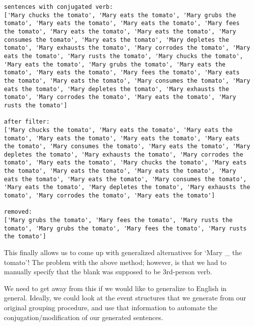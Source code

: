 \documentclass[11pt]{article}
\begin{document}
    \begin{Verbatim}[commandchars=\\\{\}]
sentences with conjugated verb: 
['Mary chucks the tomato', 'Mary eats the tomato', 'Mary grubs the tomato', 'Mary eats the tomato', 'Mary eats the tomato', 'Mary fees the tomato', 'Mary eats the tomato', 'Mary eats the tomato', 'Mary consumes the tomato', 'Mary eats the tomato', 'Mary depletes the tomato', 'Mary exhausts the tomato', 'Mary corrodes the tomato', 'Mary eats the tomato', 'Mary rusts the tomato', 'Mary chucks the tomato', 'Mary eats the tomato', 'Mary grubs the tomato', 'Mary eats the tomato', 'Mary eats the tomato', 'Mary fees the tomato', 'Mary eats the tomato', 'Mary eats the tomato', 'Mary consumes the tomato', 'Mary eats the tomato', 'Mary depletes the tomato', 'Mary exhausts the tomato', 'Mary corrodes the tomato', 'Mary eats the tomato', 'Mary rusts the tomato']

after filter: 
['Mary chucks the tomato', 'Mary eats the tomato', 'Mary eats the tomato', 'Mary eats the tomato', 'Mary eats the tomato', 'Mary eats the tomato', 'Mary consumes the tomato', 'Mary eats the tomato', 'Mary depletes the tomato', 'Mary exhausts the tomato', 'Mary corrodes the tomato', 'Mary eats the tomato', 'Mary chucks the tomato', 'Mary eats the tomato', 'Mary eats the tomato', 'Mary eats the tomato', 'Mary eats the tomato', 'Mary eats the tomato', 'Mary consumes the tomato', 'Mary eats the tomato', 'Mary depletes the tomato', 'Mary exhausts the tomato', 'Mary corrodes the tomato', 'Mary eats the tomato']

removed: 
['Mary grubs the tomato', 'Mary fees the tomato', 'Mary rusts the tomato', 'Mary grubs the tomato', 'Mary fees the tomato', 'Mary rusts the tomato']

    \end{Verbatim}

    This finally allows us to come up with generalized alternatives for
`Mary \_ the tomato'! The problem with the above method; however, is
that we had to manually specify that the blank was supposed to be
3rd-person verb.

We need to get away from this if we would like to generalize to English
in general. Ideally, we could look at the event structures that we
generate from our original grouping procedure, and use that information
to automate the conjugation/modification of our generated sentences.
\end{document}
